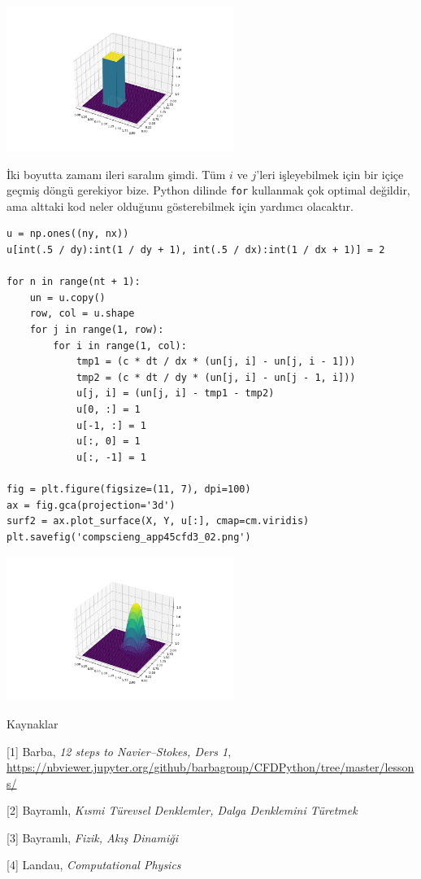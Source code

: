 \documentclass[12pt,fleqn]{article}\usepackage{../../common}
\begin{document}
\includegraphics[width=20em]{compscieng_app45cfd3_01.png}

İki boyutta zamanı ileri saralım şimdi. Tüm $i$ ve $j$'leri işleyebilmek için
bir içiçe geçmiş döngü gerekiyor bize. Python dilinde \verb!for! kullanmak çok
optimal değildir, ama alttaki kod neler olduğunu gösterebilmek için yardımcı
olacaktır.


\begin{verbatim}
u = np.ones((ny, nx))
u[int(.5 / dy):int(1 / dy + 1), int(.5 / dx):int(1 / dx + 1)] = 2

for n in range(nt + 1): 
    un = u.copy()
    row, col = u.shape
    for j in range(1, row):
        for i in range(1, col):
            tmp1 = (c * dt / dx * (un[j, i] - un[j, i - 1]))
            tmp2 = (c * dt / dy * (un[j, i] - un[j - 1, i]))
            u[j, i] = (un[j, i] - tmp1 - tmp2)
            u[0, :] = 1
            u[-1, :] = 1
            u[:, 0] = 1
            u[:, -1] = 1

fig = plt.figure(figsize=(11, 7), dpi=100)
ax = fig.gca(projection='3d')
surf2 = ax.plot_surface(X, Y, u[:], cmap=cm.viridis)
plt.savefig('compscieng_app45cfd3_02.png')
\end{verbatim}

\includegraphics[width=20em]{compscieng_app45cfd3_02.png}

Kaynaklar

[1] Barba, {\em 12 steps to Navier–Stokes, Ders 1},
    \url{https://nbviewer.jupyter.org/github/barbagroup/CFDPython/tree/master/lessons/}

[2] Bayramlı, {\em Kısmi Türevsel Denklemler, Dalga Denklemini Türetmek}

[3] Bayramlı, {\em Fizik, Akış Dinamiği}

[4] Landau, {\em Computational Physics}
\end{document}
